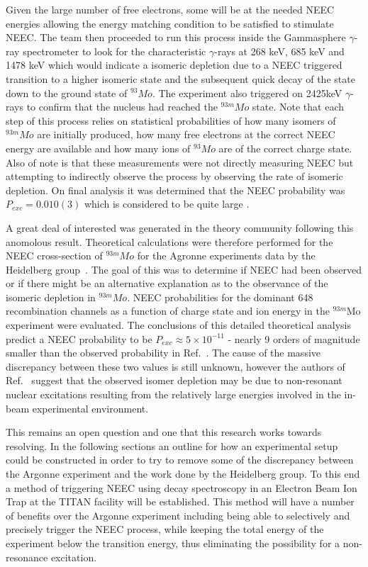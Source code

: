 \documentclass[cnatzke_thesis_proposal.tex]{subfiles}
\begin{document}
    Given the large number of free electrons, some will be at the needed NEEC energies allowing the energy matching condition to be satisfied to stimulate NEEC.
    The team then proceeded to run this process inside the Gammasphere $\gamma$-ray spectrometer to look for the characteristic $\gamma$-rays at 268 keV, 685 keV and 1478 keV which would indicate a isomeric depletion due to a NEEC triggered transition to a higher isomeric state and the subsequent quick decay of the state down to the ground state of $^{93}Mo$.
    The experiment also triggered on 2425keV $\gamma$-rays to confirm that the nucleus had reached the $^{93m}Mo$ state.
    Note that each step of this process relies on statistical probabilities of how many isomers of $^{93m}Mo$ are initially produced, how many free electrons at the correct NEEC energy are available and how many ions of $^{93}Mo$ are of the correct charge state.
    Also of note is that these measurements were not directly measuring NEEC but attempting to indirectly observe the process by observing the rate of isomeric depletion.
    On final analysis it was determined that the NEEC probability was $P_{exc} = 0.010(3)$ which is considered to be quite large \cite{Wu2019}.

    A great deal of interested was generated in the theory community following this anomolous result.
    Theoretical calculations were therefore performed for the NEEC cross-section of $^{93m}Mo$ for the Agronne experiments data by the Heidelberg group~\cite{Wu2019}.
    The goal of this was to determine if NEEC had been observed or if there might be an alternative explanation as to the observance of the isomeric depletion in $^{93m}Mo$.
    NEEC probabilities for the dominant 648 recombination channels as a function of charge state and ion energy in the $^{93m}$Mo experiment were evaluated.
    The conclusions of this detailed theoretical analysis predict a NEEC probability to be $P_{exc}\approx 5 \times 10^{-11}$ - nearly 9 orders of magnitude smaller than the observed probability in Ref.~\cite{Chiara2018}.
    The cause of the massive discrepancy between these two values is still unknown, however the authors of Ref.~\cite{Wu2019} suggest that the observed isomer depletion may be due to non-resonant nuclear excitations resulting from the relatively large energies involved in the in-beam experimental environment.

    This remains an open question and one that this research works towards resolving.
    In the following sections an outline for how an experimental setup could be constructed in order to try to remove some of the discrepancy between the Argonne experiment and the work done by the Heidelberg group.
    To this end a method of triggering NEEC using decay spectroscopy in an Electron Beam Ion Trap at the TITAN facility will be established.
    This method will have a number of benefits over the Argonne experiment including being able to selectively and precisely trigger the NEEC process, while keeping the total energy of the experiment below the transition energy, thus eliminating the possibility for a non-resonance excitation.
\end{document}
